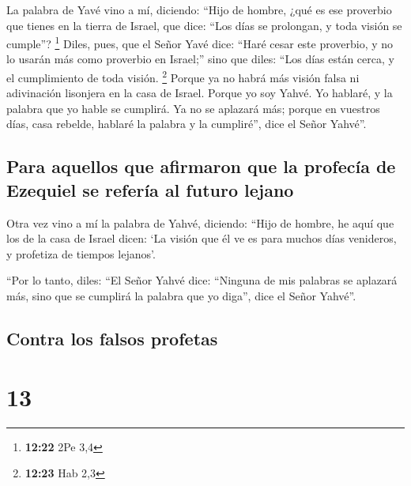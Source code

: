  La palabra de Yavé vino a mí, diciendo: 
``Hijo de hombre, ¿qué es ese proverbio que tienes en la tierra de
Israel, que dice: ``Los días se prolongan, y toda visión se cumple''?
\footnote{\textbf{12:22} 2Pe 3,4}  Diles, pues, que el
Señor Yavé dice: ``Haré cesar este proverbio, y no lo usarán más como
proverbio en Israel;'' sino que diles: ``Los días están cerca, y el
cumplimiento de toda visión. \footnote{\textbf{12:23} Hab 2,3}
 Porque ya no habrá más visión falsa ni adivinación
lisonjera en la casa de Israel.  Porque yo soy Yahvé. Yo
hablaré, y la palabra que yo hable se cumplirá. Ya no se aplazará más;
porque en vuestros días, casa rebelde, hablaré la palabra y la
cumpliré'', dice el Señor Yahvé''.

\hypertarget{para-aquellos-que-afirmaron-que-la-profecuxeda-de-ezequiel-se-referuxeda-al-futuro-lejano}{%
\subsection{Para aquellos que afirmaron que la profecía de Ezequiel se
refería al futuro
lejano}\label{para-aquellos-que-afirmaron-que-la-profecuxeda-de-ezequiel-se-referuxeda-al-futuro-lejano}}

 Otra vez vino a mí la palabra de Yahvé, diciendo:
 ``Hijo de hombre, he aquí que los de la casa de Israel
dicen: `La visión que él ve es para muchos días venideros, y profetiza
de tiempos lejanos'.

 ``Por lo tanto, diles: ``El Señor Yahvé dice: ``Ninguna
de mis palabras se aplazará más, sino que se cumplirá la palabra que yo
diga'', dice el Señor Yahvé''.

\hypertarget{contra-los-falsos-profetas}{%
\subsection{Contra los falsos
profetas}\label{contra-los-falsos-profetas}}

\hypertarget{section-12}{%
\section{13}\label{section-12}}

